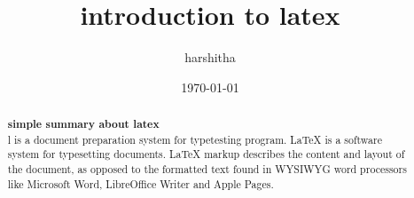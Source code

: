 \documentclass[a3 paper,12pt]{article}
\title{introduction to latex}
\author{harshitha}
\date{\today}
\begin{document}
\begin{abstract}
\textbf{simple summary about latex}\\
l is a document preparation system for typetesting program.
LaTeX is a software system for typesetting documents. LaTeX markup describes the content and layout of the document, as opposed to the formatted text found in WYSIWYG word processors like Microsoft Word, LibreOffice Writer and Apple Pages. 
\end{abstract}
\end{document}
